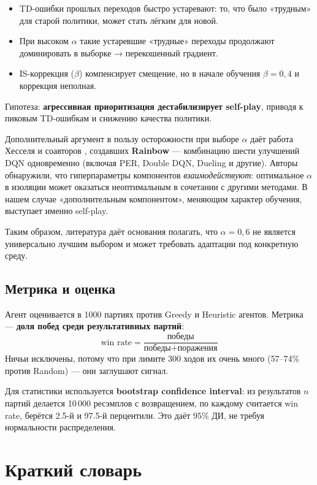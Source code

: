 \documentclass[a4paper, 11pt]{article}
\begin{document}
\begin{itemize}[itemsep=3pt]
  \item TD-ошибки прошлых переходов быстро устаревают: то, что было
        «трудным» для старой политики, может стать лёгким для новой.
  \item При высоком $\alpha$ такие устаревшие «трудные» переходы
        продолжают доминировать в выборке → перекошенный градиент.
  \item IS-коррекция ($\beta$) компенсирует смещение, но в начале
        обучения $\beta = 0{,}4$ и коррекция неполная.
\end{itemize}

Гипотеза: \textbf{агрессивная приоритизация дестабилизирует self-play},
приводя к пиковым TD-ошибкам и снижению качества политики.

Дополнительный аргумент в пользу осторожности при выборе $\alpha$ даёт
работа Хесселя и соавторов \cite{Hessel18}, создавших \textbf{Rainbow} —
комбинацию шести улучшений DQN одновременно (включая PER, Double DQN,
Dueling и другие). Авторы обнаружили, что гиперпараметры компонентов
\emph{взаимодействуют}: оптимальное $\alpha$ в изоляции может оказаться
неоптимальным в сочетании с другими методами. В нашем случае
«дополнительным компонентом», меняющим характер обучения, выступает
именно self-play.

Таким образом, литература даёт основания полагать, что $\alpha = 0{,}6$
не является универсально лучшим выбором и может требовать адаптации под
конкретную среду.

\subsection{Метрика и оценка}

Агент оценивается в 1000 партиях против Greedy и Heuristic агентов.
Метрика — \textbf{доля побед среди результативных партий}:
\[
  \text{win rate} = \frac{\text{победы}}{\text{победы} + \text{поражения}}
\]
Ничьи исключены, потому что при лимите 300 ходов их очень много
(57–74\% против Random) — они заглушают сигнал.

Для статистики используется \textbf{bootstrap confidence interval}:
из результатов $n$ партий делается 10\,000 ресэмплов с возвращением,
по каждому считается win rate, берётся 2.5-й и 97.5-й перцентили.
Это даёт 95\% ДИ, не требуя нормальности распределения.

\section*{Краткий словарь}
\end{document}
